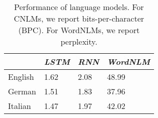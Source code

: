 \begin{table}[t]
  \begin{small}
  \begin{center}
    \begin{tabular}{l|l|l|l}
      \multicolumn{1}{c|}{}&\emph{LSTM}&\emph{RNN}&\emph{WordNLM}\\
      \hline
	    English & 1.62 & 2.08 & 48.99  \\
	    German &  1.51 & 1.83 & 37.96   \\
	    Italian & 1.47 & 1.97 & 42.02  \\
    \end{tabular}
  \end{center}
  \end{small}
  \caption{\label{tab:lm-results} Performance of language models. For CNLMs, we report bits-per-character (BPC). For WordNLMs, we report perplexity.}
\end{table}






